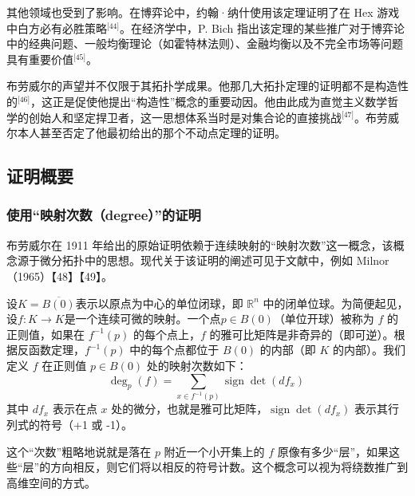 其他领域也受到了影响。在博弈论中，约翰·纳什使用该定理证明了在 Hex 游戏中白方必有必胜策略\(^\text{[44]}\)。在经济学中，P. Bich 指出该定理的某些推广对于博弈论中的经典问题、一般均衡理论（如霍特林法则）、金融均衡以及不完全市场等问题具有重要价值\(^\text{[45]}\)。

布劳威尔的声望并不仅限于其拓扑学成果。他那几大拓扑定理的证明都不是构造性的\(^\text{[46]}\)，这正是促使他提出“构造性”概念的重要动因。他由此成为直觉主义数学哲学的创始人和坚定捍卫者，这一思想体系当时是对集合论的直接挑战\(^\text{[47]}\)。布劳威尔本人甚至否定了他最初给出的那个不动点定理的证明。
\subsection{证明概要}
\subsubsection{使用“映射次数（degree）”的证明}
布劳威尔在 1911 年给出的原始证明依赖于连续映射的“映射次数”这一概念，该概念源于微分拓扑中的思想。现代关于该证明的阐述可见于文献中，例如 Milnor（1965）【48】【49】。

设$K = \overline{B(0)}$表示以原点为中心的单位闭球，即 $\mathbb{R}^n$ 中的闭单位球。为简便起见，设$f: K \to K$是一个连续可微的映射。一个点$p \in B(0)$（单位开球）被称为 $f$ 的正则值，如果在 $f^{-1}(p)$ 的每个点上，$f$ 的雅可比矩阵是非奇异的（即可逆）。根据反函数定理，$f^{-1}(p)$ 中的每个点都位于 $B(0)$ 的内部（即 $K$ 的内部）。我们定义 $f$ 在正则值 $p \in B(0)$ 处的映射次数如下：
$$
\deg_p(f) = \sum_{x \in f^{-1}(p)} \operatorname{sign} \det(df_x)~
$$
其中 $df_x$ 表示在点 $x$ 处的微分，也就是雅可比矩阵，$\operatorname{sign} \det(df_x)$ 表示其行列式的符号（+1 或 -1）。

这个“次数”粗略地说就是落在 $p$ 附近一个小开集上的 $f$ 原像有多少“层”，如果这些“层”的方向相反，则它们将以相反的符号计数。这个概念可以视为将绕数推广到高维空间的方式。


